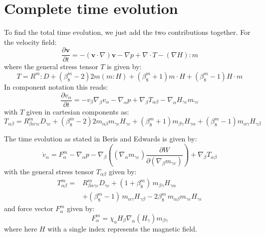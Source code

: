 \documentclass[reqno]{article}
\begin{document}
  \section{Complete time evolution}

  To find the total time evolution, we just add the two contributions together.
  For the velocity field:
  \begin{equation}
    \frac{\partial \mathbf{v}}{\partial t}
    =
    - \left( \mathbf{v} \cdot \nabla \right) \mathbf{v}
    - \nabla p
    + \nabla \cdot T
    - \left( \nabla H \right) : m
  \end{equation}
  where the general stress tensor $T$ is given by:
  \begin{equation}
    T
    =
    R^m : D
    + \left( \beta^m_8 - 2 \right) 2m \left( m : H \right)
    + \left( \beta^m_8 + 1 \right) m\cdot H
    + \left( \beta^m_8 - 1 \right) H \cdot m
  \end{equation}
  In component notation this reads:
  \begin{equation}
    \frac{\partial v_\alpha}{\partial t}
    =
    -v_\beta \nabla_\beta v_\alpha
    - \nabla_\alpha p
    + \nabla_\beta T_{\alpha\beta}
    - \nabla_\alpha H_{\gamma\varepsilon} m_{\gamma\varepsilon}
  \end{equation}
  with $T$ given in cartesian components as:
  \begin{equation}
    T_{\alpha\beta}
    =
    R^m_{\beta\alpha\gamma\varepsilon} D_{\gamma\varepsilon}
    +
    \left( \beta^m_8 - 2 \right)
    2m_{\alpha\beta} m_{\gamma\varepsilon} H_{\gamma\varepsilon}
    + \left( \beta^m_8 + 1 \right) m_{\beta\gamma} H_{\gamma\alpha}
    + \left( \beta^m_8 - 1 \right) m_{\alpha\gamma} H_{\gamma\beta}
  \end{equation}
  
  The time evolution as stated in Beris and Edwards is given by:
  \begin{equation}
    \dot{v}_\alpha
    =
    F^m_\alpha
    - \nabla_\alpha p
    - \nabla_\beta \left( \left( \nabla_\alpha m_{\gamma\varepsilon}\right) \frac{\partial W}{\partial (\nabla_\beta m_{\gamma\varepsilon})} \right)
    + \nabla_\beta T_{\alpha \beta}
  \end{equation}
  with the general stress tensor $T_{\alpha\beta}$ given by:
  \begin{equation}
    \begin{split}
    T^m_{\alpha\beta}
    =
    &R^m_{\beta\alpha\gamma\varepsilon} D_{\gamma \varepsilon}
    + \left( 1 + \beta^m_8 \right) \, m_{\beta\gamma} H_{\gamma\alpha} \\
    &+ \left( \beta^m_8 - 1 \right) \, m_{\alpha\gamma} H_{\gamma\beta}
    - 2 \beta^m_8 \, m_{\alpha\beta} m_{\gamma\varepsilon} H_{\gamma\varepsilon}
    \end{split}
  \end{equation}
  and force vector $F^m_\alpha$ given by:
  \begin{equation}
    F^m_{\alpha}
    =
    \chi_a
    H_\beta
    \nabla_\alpha(H_\gamma)
    m_{\beta\gamma}
  \end{equation}
  where here $H$ with a single index represents the magnetic field.
\end{document}
